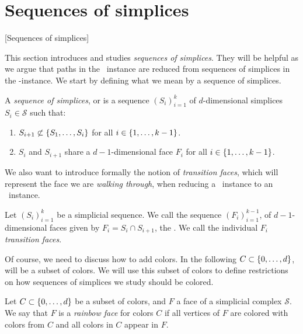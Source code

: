 \section{Sequences of simplices}[Sequences of simplices]

This section introduces and studies \emph{sequences of simplices}.  They will be helpful as we argue that paths in the \EndOfLine\ instance are reduced from sequences of simplices in the \Tarskistar-instance. We start by defining what we mean by a sequence of simplices.

\begin{definition}\label{def:sequence_of_simplices}
	A \emph{sequence of simplices}, or  is a sequence ${\left(S_i\right)}_{i=1}^{k}$ of $d$-dimensional simplices $S_i \in \mathcal{S}$ such that:
	\begin{enumerate}
		\item $S_{i+1} \not\subset \left\{S_1, \dots, S_i\right\}$ for all $i \in \left\{1, \dots, k-1\right\}$.
		\item $S_i$ and $S_{i+1}$ share a $d-1$-dimensional face $F_i$ for all $i \in \left\{1, \dots, k-1\right\}$.
	\end{enumerate}
\end{definition}

We also want to introduce formally the notion of \emph{transition faces}, which will represent the face we are \emph{walking through}, when reducing a \Sperner\ instance to an \EndOfLine\ instance.

\begin{definition}\label{def:transition_faces}
	Let ${\left(S_i\right)}_{i=1}^{k}$ be a simplicial sequence. We call the sequence ${\left(F_i\right)}_{i=1}^{k-1}$, of $d-1$-dimensional faces given by $F_i = S_i \cap S_{i+1}$, the . We call the individual $F_i$ \emph{transition faces}.
\end{definition}

Of course, we need to discuss how to add colors. In the following $C \subset \left\{0, \dots, d\right\}$, will be a subset of colors. We will use this subset of colors to define restrictions on how sequences of simplices we study should be colored.

\begin{definition}
	Let $C \subset \left\{0, \dots, d\right\}$ be a subset of colors, and $F$ a face of a simplicial complex $\mathcal{S}$. We say that $F$ is a \emph{rainbow face} for colors $C$ if all vertices of $F$ are colored with colors from $C$ and all colors in $C$ appear in $F$.
\end{definition}

